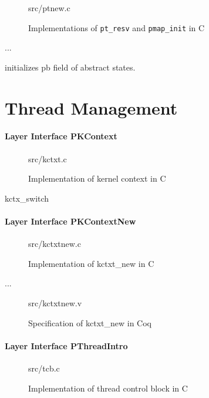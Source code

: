 \begin{figure}
	 {src/ptnew.c}
	\caption{Implementations of \texttt{pt\_resv} and \texttt{pmap\_init} in C}
	\label{fig:ptnew_c}
\end{figure}

...

initializes \textsf{pb} field of abstract states.



\section{Thread Management}

\paragraph{Layer Interface PKContext}

\begin{figure}
	 {src/kctxt.c}
	\caption{Implementation of kernel context in C}
	\label{fig:kctxt_c}
\end{figure}

\textsf{kctx\_switch}

\paragraph{Layer Interface PKContextNew}

\begin{figure}
	 {src/kctxtnew.c}
	\caption{Implementation of \textsf{kctxt\_new} in C}
	\label{fig:kctxtnew_c}
\end{figure}

...

\begin{figure}
	 {src/kctxtnew.v}
	\caption{Specification of \textsf{kctxt\_new} in Coq}
	\label{fig:kctxtnew_v}
\end{figure}


\paragraph{Layer Interface PThreadIntro}

\begin{figure}
	 {src/tcb.c}
	\caption{Implementation of thread control block in C}
	\label{fig:tcb_c}
\end{figure}


